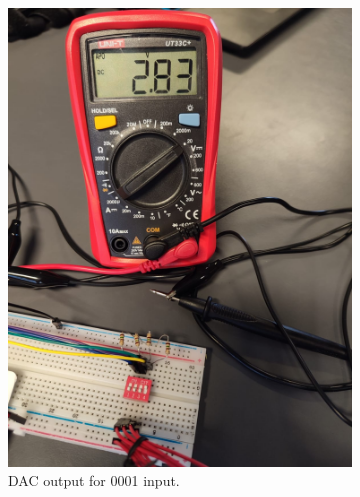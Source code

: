 \begin{figure}[H]
\begin{subfigure}[]{0.2\textwidth}
\includegraphics[width=\linewidth]{./Figures/DAC_Prac_0001.jpeg}
\caption{DAC output for 0001 input.} 			
\label{subfig:dac_prac_0001}	
\end{subfigure}
\hfill
\begin{subfigure}[]{0.2\textwidth}

\end{subfigure}
\end{figure}
